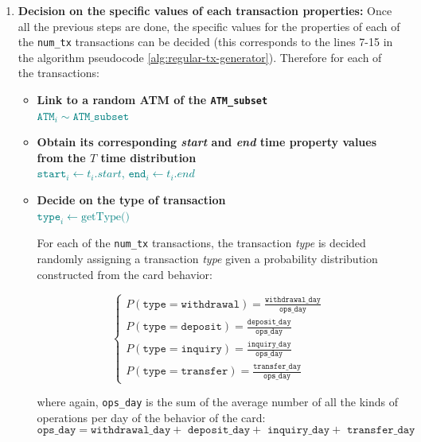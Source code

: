 \begin{enumerate}
    \item \textbf{Decision on the specific values of each transaction properties:}
    Once all the previous steps are done, the specific values for the properties of each of the \texttt{num\_tx} transactions can be decided (this corresponds to the lines 7-15 in the algorithm pseudocode \ref{alg:regular-tx-generator}). Therefore for each of the transactions:
    \begin{itemize}
        \item \textbf{Link to a random ATM of the \texttt{ATM\_subset}}\\
        {\footnotesize \textcolor{teal}{$\texttt{ATM}_{i} \sim \texttt{ATM\_subset}$}}
        \item \textbf{Obtain its corresponding \emph{start} and \emph{end} time property values from the $T$ time distribution}\\
        {\footnotesize \textcolor{teal}{$\texttt{start}_{i} \gets t_i.start$, }}
        {\footnotesize \textcolor{teal}{$\texttt{end}_{i} \gets t_i.end$}}
        \item \textbf{Decide on the type of transaction}\\
        {\footnotesize \textcolor{teal}{$\texttt{type}_{i} \gets \text{getType()}$}}
        
        For each of the \texttt{num\_tx} transactions, the transaction \emph{type} is decided randomly assigning a transaction \emph{type} given a probability distribution constructed from the card behavior:
        
        $$
        \begin{cases}
          P(\texttt{type} =  \texttt{withdrawal}) = \frac{\texttt{withdrawal\_day}}{\texttt{ops\_day}} \\[8pt]
          P(\texttt{type} =  \texttt{deposit}) = \frac{\texttt{deposit\_day}}{\texttt{ops\_day}} \\[8pt]
          P(\texttt{type} = \texttt{inquiry}) = \frac{\texttt{inquiry\_day}}{\texttt{ops\_day}} \\[8pt]
          P(\texttt{type} =  \texttt{transfer}) = \frac{\texttt{transfer\_day}}{\texttt{ops\_day}} 
        \end{cases}
        $$

        where again, \texttt{ops\_day} is the sum of the average number of all the kinds of operations per day of the behavior of the card: 
        $$\texttt{ops\_day} = \texttt{withdrawal\_day} + \texttt{ deposit\_day} + \texttt{ inquiry\_day} + \texttt{ transfer\_day}$$


\end{itemize}
\end{enumerate}
